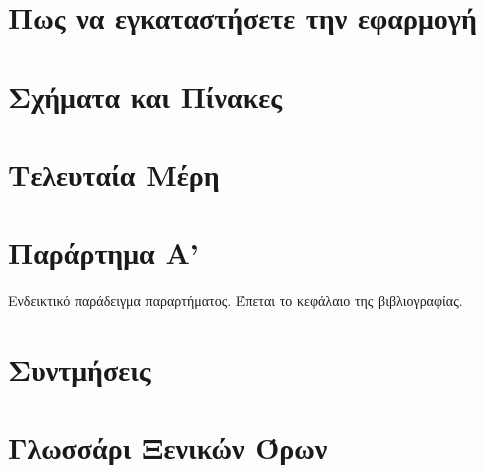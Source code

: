 \documentclass[a4paper,11pt,oneside,openany]{ioniothesis}
\begin{document}
\chapter{Πως να εγκαταστήσετε την εφαρμογή} \label{chapter:installation}



\chapter{Σχήματα και Πίνακες} \label{chapter:sximata}



\chapter{Τελευταία Μέρη} \label{chapter:telos}




\chapter*{Παράρτημα Α'} \pagestyle{empty}
Ενδεικτικό παράδειγμα παραρτήματος.
Έπεται το κεφάλαιο της βιβλιογραφίας.



\begin{thebibliography}{99} 
\pagestyle{headings}

\end{thebibliography}


\chapter*{Συντμήσεις} \pagestyle{empty}



\chapter*{Γλωσσάρι Ξενικών Όρων} \pagestyle{empty}






\newpage
{}
\printindex
\end{document}
